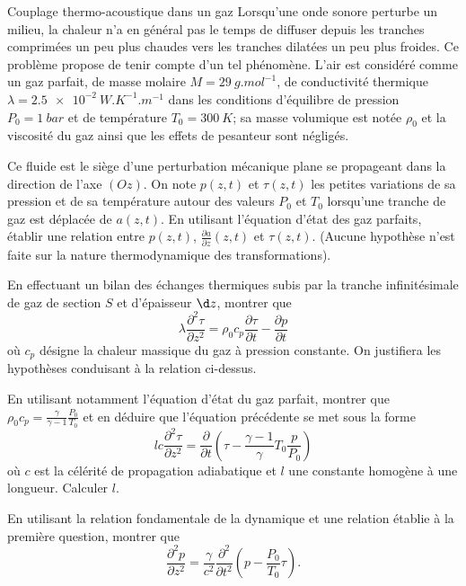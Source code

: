 \begin{exo}[PC]{Couplage thermo-acoustique dans un gaz}
Lorsqu'une onde sonore perturbe un milieu, la chaleur n'a en général pas le temps de diffuser depuis les tranches comprimées un peu plus chaudes vers les tranches dilatées un peu plus froides. Ce problème propose de tenir compte d'un tel phénomène. L'air est considéré comme un gaz parfait, de masse molaire $M=\SI{29}{g.mol^{-1}}$, de conductivité thermique $\lambda=\SI{2,5e-2}{W.K^{-1}.m^{-1}}$ dans les conditions d'équilibre de pression $P_0=\SI{1}{bar}$ et de température $T_0=\SI{300}{K}$; sa masse volumique est notée $\rho_0$ et la viscosité du gaz ainsi que les effets de pesanteur sont négligés.
\begin{quest}
\item Ce fluide est le siège d'une perturbation mécanique plane se propageant dans la direction de l'axe $(Oz)$. On note $p(z,t)$ et $\tau(z,t)$ les petites variations de sa pression et de sa température autour des valeurs $P_0$ et $T_0$ lorsqu'une tranche de gaz est déplacée de $a(z,t)$. En utilisant l'équation d'état des gaz parfaits, établir une relation entre $p(z,t)$, $\frac{\partial a}{\partial z}(z,t)$ et $\tau(z,t)$. (Aucune hypothèse n'est faite sur la nature thermodynamique des transformations).
\item En effectuant un bilan des échanges thermiques subis par la tranche infinitésimale de gaz de section $S$ et d'épaisseur $\d z$, montrer que
\begin{equation}
\lambda\frac{\partial^2 \tau}{\partial z^2}=\rho_0 c_p\frac{\partial \tau}{\partial t}-\frac{\partial p}{\partial t}
\end{equation}
où $c_p$ désigne la chaleur massique du gaz à pression constante. On justifiera les hypothèses conduisant à la relation ci-dessus.
\item En utilisant notamment l'équation d'état du gaz parfait, montrer que $\rho_0c_p=\frac{\gamma}{\gamma-1}\frac{P_0}{T_0}$ et en déduire que l'équation précédente se met sous la forme
$$lc\frac{\partial^2\tau}{\partial z^2}=\frac{\partial}{\partial t}\left(\tau-\frac{\gamma-1}{\gamma}T_0\frac{p}{P_0}\right)$$ où $c$ est la célérité de propagation adiabatique et $l$ une constante homogène à une longueur. Calculer $l$.
\item En utilisant la relation fondamentale de la dynamique et une relation établie à la première question, montrer que
$$\frac{\partial^2p}{\partial z^2}=\frac{\gamma}{c^2}\frac{\partial^2}{\partial t^2}\left(p-\frac{P_0}{T_0}\tau\right).$$

\end{quest}
\end{exo}
